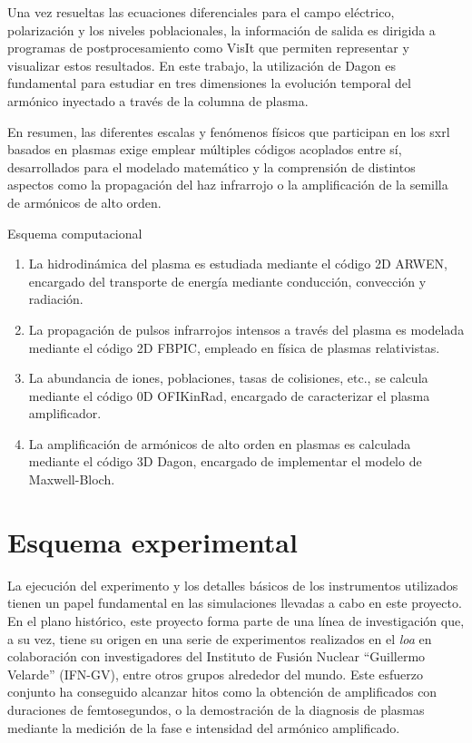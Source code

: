 \begin{itemize}
      Una vez resueltas las ecuaciones diferenciales para el campo eléctrico, polarización y los niveles poblacionales, la información de salida es dirigida a programas de postprocesamiento como VisIt que permiten representar y visualizar estos resultados. En este trabajo, la utilización de Dagon es fundamental para estudiar en tres dimensiones la evolución temporal del armónico inyectado a través de la columna de plasma.

\end{itemize}

En resumen, las diferentes escalas y fenómenos físicos que participan en los \acrshort{sxrl} basados en plasmas exige emplear múltiples códigos acoplados entre sí, desarrollados para el modelado matemático y la comprensión de distintos aspectos como la propagación del haz infrarrojo o la amplificación de la semilla de armónicos de alto orden.

\begin{footheorem*}{Esquema computacional}

  \begin{enumerate}

        \item La hidrodinámica del plasma es estudiada mediante el código 2D ARWEN, encargado del transporte de energía mediante conducción, convección y radiación.
        \item La propagación de pulsos infrarrojos intensos a través del plasma es modelada mediante el código 2D FBPIC, empleado en física de plasmas relativistas.
        \item La abundancia de iones, poblaciones, tasas de colisiones, etc., se calcula mediante el código 0D OFIKinRad, encargado de caracterizar el plasma amplificador.
        \item La amplificación de armónicos de alto orden en plasmas es calculada mediante el código 3D Dagon, encargado de implementar el modelo de Maxwell-Bloch.

  \end{enumerate}

\end{footheorem*}

\section{Esquema experimental}\label{sec:3.3}
La ejecución del experimento y los detalles básicos de los instrumentos utilizados tienen un papel fundamental en las simulaciones llevadas a cabo en este proyecto. En el plano histórico, este proyecto forma parte de una línea de investigación que, a su vez, tiene su origen en una serie de experimentos realizados en el \emph{\acrfull{loa}} en colaboración con investigadores del Instituto de Fusión Nuclear \enquote{Guillermo Velarde} (IFN-GV), entre otros grupos alrededor del mundo. Este esfuerzo conjunto ha conseguido alcanzar hitos como la obtención de  amplificados con duraciones de femtosegundos, o la demostración de la diagnosis de plasmas mediante la medición de la fase e intensidad del armónico amplificado\autocite{Depresseux2015,Tuitje2020}.

